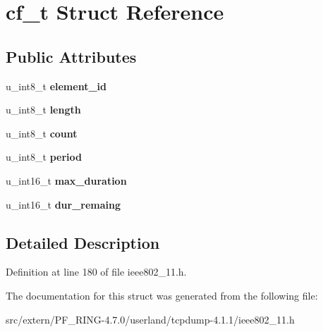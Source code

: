 \hypertarget{structcf__t}{
\section{cf\_\-t Struct Reference}
\label{structcf__t}
}
\subsection*{Public Attributes}
\begin{DoxyCompactItemize}
\item 
\hypertarget{structcf__t_a843b4527bd11e4cd41a111fba5288070}{
u\_\-int8\_\-t {\bfseries element\_\-id}}
\label{structcf__t_a843b4527bd11e4cd41a111fba5288070}

\item 
\hypertarget{structcf__t_ad5eefa5e5c9237418b52f030a18d3d48}{
u\_\-int8\_\-t {\bfseries length}}
\label{structcf__t_ad5eefa5e5c9237418b52f030a18d3d48}

\item 
\hypertarget{structcf__t_ab177dd98cb11051d7ec005d2d29b1a52}{
u\_\-int8\_\-t {\bfseries count}}
\label{structcf__t_ab177dd98cb11051d7ec005d2d29b1a52}

\item 
\hypertarget{structcf__t_aa8828629fef6237488c1842078096672}{
u\_\-int8\_\-t {\bfseries period}}
\label{structcf__t_aa8828629fef6237488c1842078096672}

\item 
\hypertarget{structcf__t_a1ab72495c28b7b14daf04784a11130c8}{
u\_\-int16\_\-t {\bfseries max\_\-duration}}
\label{structcf__t_a1ab72495c28b7b14daf04784a11130c8}

\item 
\hypertarget{structcf__t_a3e13c992b7d20109b1343bb6df88d905}{
u\_\-int16\_\-t {\bfseries dur\_\-remaing}}
\label{structcf__t_a3e13c992b7d20109b1343bb6df88d905}

\end{DoxyCompactItemize}


\subsection{Detailed Description}


Definition at line 180 of file ieee802\_\-11.h.



The documentation for this struct was generated from the following file:\begin{DoxyCompactItemize}
\item 
src/extern/PF\_\-RING-\/4.7.0/userland/tcpdump-\/4.1.1/ieee802\_\-11.h\end{DoxyCompactItemize}
